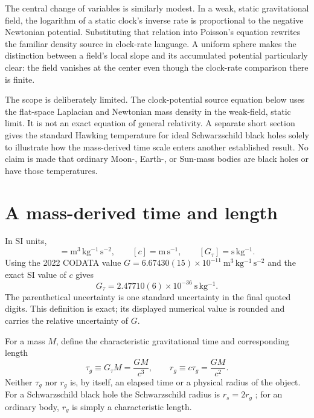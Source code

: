 \documentclass[12pt]{article}
\begin{document}
The central change of variables is similarly modest. In a weak, static gravitational field, the logarithm of a static clock's inverse rate is proportional to the negative Newtonian potential. Substituting that relation into Poisson's equation rewrites the familiar density source in clock-rate language. A uniform sphere makes the distinction between a field's local slope and its accumulated potential particularly clear: the field vanishes at the center even though the clock-rate comparison there is finite.

The scope is deliberately limited. The clock-potential source equation below uses the flat-space Laplacian and Newtonian mass density in the weak-field, static limit. It is not an exact equation of general relativity. A separate short section gives the standard Hawking temperature for ideal Schwarzschild black holes solely to illustrate how the mass-derived time scale enters another established result. No claim is made that ordinary Moon-, Earth-, or Sun-mass bodies are black holes or have those temperatures.

\section{A mass-derived time and length}

In SI units,
\begin{equation}
  [G]=\mathrm{m^3\,kg^{-1}\,s^{-2}},
  \qquad
  [c]=\mathrm{m\,s^{-1}},
  \qquad
  [G_{\tau}]=\mathrm{s\,kg^{-1}}.
  \label{eq:units}
\end{equation}
Using the 2022 CODATA value $G=6.67430(15)\times10^{-11}\ \mathrm{m^3\,kg^{-1}\,s^{-2}}$ and the exact SI value of $c$ gives
\begin{equation}
  G_{\tau}=2.47710(6)\times10^{-36}\ \mathrm{s\,kg^{-1}}.
  \label{eq:numerical-Gtau}
\end{equation}
The parenthetical uncertainty is one standard uncertainty in the final quoted digits. This definition is exact; its displayed numerical value is rounded and carries the relative uncertainty of $G$.

For a mass $M$, define the characteristic gravitational time and corresponding length
\begin{equation}
  \tau_g\equiv G_{\tau}M=\frac{GM}{c^3},
  \qquad
  r_g\equiv c\tau_g=\frac{GM}{c^2}.
  \label{eq:gravitational-scales}
\end{equation}
Neither $\tau_g$ nor $r_g$ is, by itself, an elapsed time or a physical radius of the object. For a Schwarzschild black hole the Schwarzschild radius is $r_s=2r_g$ \cite{Schwarzschild1916}; for an ordinary body, $r_g$ is simply a characteristic length.
\end{document}
